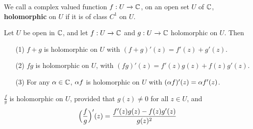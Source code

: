 \begin{definition}
    We call a complex valued function $f:U \xrightarrow{} \mathbb{C}$, on an open set
    $U$ of $\mathbb{C}$, \textbf{holomorphic} on $U$ if it is of class  $C^1$ on  $U$.
\end{definition}

\begin{theorem}\label{3.2.2}
    Let $U$ be open in  $\mathbb{C}$, and let  $f:U \xrightarrow{} \mathbb{C}$ and $g:U
    \xrightarrow{} \mathbb{C}$ holomorphic on $U$. Then
    \begin{enumerate}
        \item[(1)] $f+g$ is holomorphic on  $U$ with $(f+g)'(z)=f'(z)+g'(z)$.

        \item[(2)] $fg$ is holomorphic on  $U$, with
            $(fg)'(z)=f'(z)g(z)+f(z)g'(z)$.

        \item[(3)] For any $\alpha \in \mathbb{C}$,  $\alpha f$ is holomorphic on  $U$ with $(\alpha
            f)'(z)=\alpha f'(z)$.
    \end{enumerate}
\end{theorem}
\begin{corollary}
    $\frac{f}{g}$ is holomorphic on $U$, provided that  $g(z) \neq 0$ for all $z
    \in U$, and
    \begin{equation*}
        \Big{(} \frac{f}{g} \Big{)}'(z)=\frac{f'(z)g(z)-f(z)g'(z)}{g(z)^2}
    \end{equation*}
\end{corollary}

